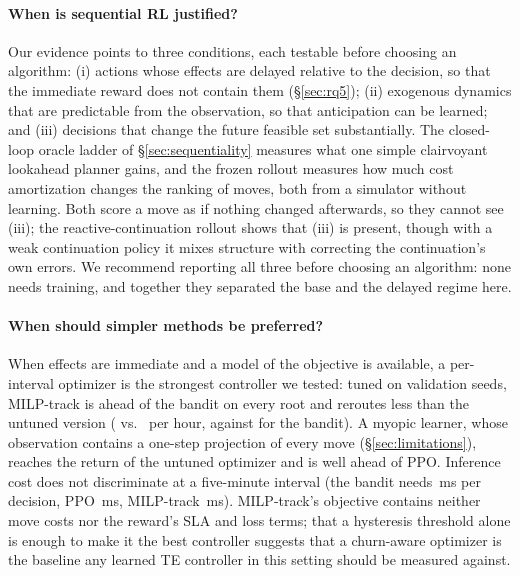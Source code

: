 \paragraph{When is sequential RL justified?} Our evidence points to three
conditions, each testable before choosing an algorithm: (i) actions whose
effects are delayed relative to the decision, so that the immediate reward
does not contain them (\S\ref{sec:rq5}); (ii) exogenous dynamics that are
predictable from the observation, so that anticipation can be learned; and
(iii) decisions that change the future feasible set substantially. The
closed-loop oracle ladder of \S\ref{sec:sequentiality} measures what one
simple clairvoyant lookahead planner gains, and the frozen rollout measures
how much cost amortization changes the ranking of moves, both from a
simulator without learning. Both score a move as if nothing changed
afterwards, so they cannot see (iii); the reactive-continuation rollout shows
that (iii) is present, though with a weak continuation policy it mixes
structure with correcting the continuation's own errors. We recommend
reporting all three before choosing an algorithm: none needs training, and
together they separated the base and the delayed regime here.

\paragraph{When should simpler methods be preferred?} When effects are
immediate and a model of the objective is available, a per-interval optimizer
is the strongest controller we tested: tuned on validation seeds, MILP-track
is ahead of the bandit on every root and reroutes less than the untuned
version (\TestMilpTunedReroutes{} vs.\ \TestMilpReroutes{} per hour, against
\TestBanditReroutes{} for the bandit). A myopic learner, whose observation
contains a one-step projection of every move (\S\ref{sec:limitations}),
reaches the return of the untuned optimizer and is well ahead of PPO.
Inference cost does not discriminate at a five-minute interval (the bandit
needs \InfBanditMs{}\,ms per decision, PPO \InfPPOMs{}\,ms, MILP-track
\InfMilpMs{}\,ms). MILP-track's objective contains neither move costs nor
the reward's SLA and loss terms; that a hysteresis threshold alone is enough
to make it the best controller suggests that a churn-aware optimizer is the
baseline any learned TE controller in this setting should be measured
against.

